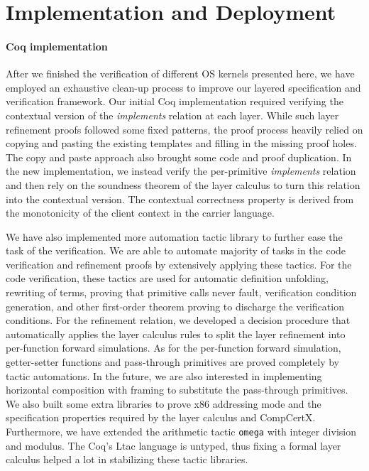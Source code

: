 
\section{Implementation and Deployment}
\label{sec:eval:impl}

\paragraph{Coq implementation}

After we finished the verification of different OS kernels presented
here, we have employed an exhaustive clean-up process to improve our
layered specification and verification framework.  Our initial Coq
implementation required verifying the contextual version of the
{\em implements} relation at each layer.  While such layer refinement
proofs followed some fixed patterns, the proof process heavily relied
on copying and pasting the existing templates and filling in the
missing proof holes.  The copy and paste approach also brought some
code and proof duplication.  In the new implementation, we instead
verify the per-primitive {\em implements} relation and then rely on the
soundness theorem of the layer calculus to turn this relation into the
contextual version. The contextual correctness property is derived
from the monotonicity of the client context in the carrier language.

We have also implemented more automation tactic library to further
ease the task of the verification. We are able to automate majority of
tasks in the code verification and refinement proofs by extensively
applying these tactics. For the code verification, these tactics are
used for automatic definition unfolding, rewriting of terms, proving
that primitive calls never fault, verification condition generation,
and other first-order theorem proving to discharge the verification
conditions.  For the refinement relation, we developed a decision
procedure that automatically applies the layer calculus rules to split
the layer refinement into per-function forward simulations.  As for
the per-function forward simulation, getter-setter functions and
pass-through primitives are proved completely by tactic automations.
In the future, we are also interested in implementing horizontal
composition with framing to substitute the pass-through primitives.
We also built some extra libraries to prove x86 addressing mode and
the specification properties required by the layer calculus and
CompCertX.  Furthermore, we have extended the arithmetic
tactic \texttt{omega} with integer division and modulus.  The Coq's
Ltac language is untyped, thus fixing a formal layer calculus helped a
lot in stabilizing these tactic libraries.

